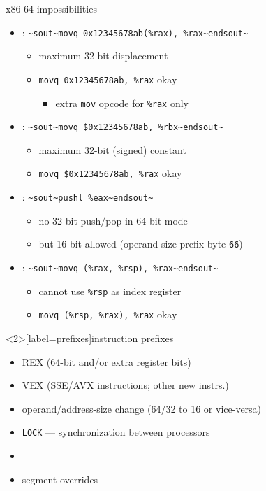 \begin{frame}[fragile,label=x8664impos]{x86-64 impossibilities}
    \begin{itemize}
    \item {}: \lstinline|~sout~movq 0x12345678ab(%rax), %rax~endsout~|
        \begin{itemize}
        \item maximum 32-bit displacement
        \item \lstinline|movq 0x12345678ab, %rax| okay
            \begin{itemize}
            \item extra {\tt mov} opcode for {\tt \%rax} only
            \end{itemize}
        \end{itemize}
    \item {}: \lstinline|~sout~movq $0x12345678ab, %rbx~endsout~|
        \begin{itemize}
        \item maximum 32-bit (signed) constant
        \item \lstinline|movq $0x12345678ab, %rax| okay
        \end{itemize}
    \item {}: \lstinline|~sout~pushl %eax~endsout~|
        \begin{itemize}
        \item no 32-bit push/pop in 64-bit mode
        \item but 16-bit allowed (operand size prefix byte {\tt 66})
        \end{itemize}
    \item {}: \lstinline|~sout~movq (%rax, %rsp), %rax~endsout~|
        \begin{itemize}
        \item cannot use \lstinline|%rsp| as index register
        \item \lstinline|movq (%rsp, %rax), %rax| okay
        \end{itemize}
    \end{itemize}
\end{frame}

\begin{frame}<2>[label=prefixes]{instruction prefixes}
    \begin{itemize}
    \item REX (64-bit and/or extra register bits)
    \item VEX (SSE/AVX instructions; other new instrs.)
    \item operand/address-size change (64/32 to 16 or vice-versa)
    \item {\tt LOCK} --- synchronization between processors
    \item {}
    \item segment overrides
    \end{itemize}
\end{frame}

